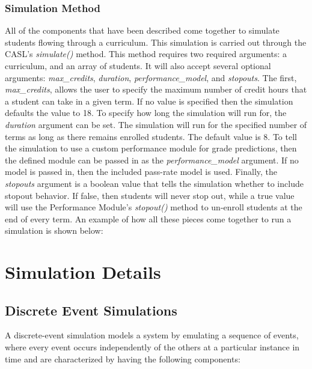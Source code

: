 \documentclass[botnum, fleqn]{unmeethesis}
\begin{document}
    \subsection{Simulation Method}
      All of the components that have been described come together to simulate students flowing through a curriculum. This simulation is carried out through the CASL's \textit{simulate()} method. This method requires two required arguments: a curriculum, and an array of students. It will also accept several optional arguments: \textit{max\_credits}, \textit{duration}, \textit{performance\_model}, and \textit{stopouts}. The first, \textit{max\_credits}, allows the user to specify the maximum number of credit hours that a student can take in a given term. If no value is specified then the simulation defaults the value to 18. To specify how long the simulation will run for, the \textit{duration} argument can be set. The simulation will run for the specified number of terms as long as there remains enrolled students. The default value is 8. To tell the simulation to use a custom performance module for grade predictions, then the defined module can be passed in as the \textit{performance\_model} argument. If no model is passed in, then the included pass-rate model is used. Finally, the \textit{stopouts} argument is a boolean value that tells the simulation whether to include stopout behavior. If false, then students will never stop out, while a true value will use the Performance Module's \textit{stopout()} method to un-enroll students at the end of every term. An example of how all these pieces come together to run a simulation is shown below:

      


\chapter{Simulation Details}

  \section{Discrete Event Simulations}
    A discrete-event simulation models a system by emulating a sequence of events, where every event occurs independently of the others at a particular instance in time and are characterized by having the following components:
\end{document}

